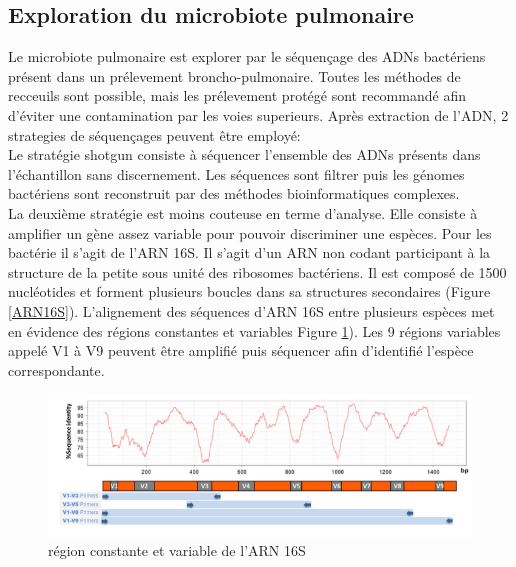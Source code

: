 \documentclass[12pt,a4paper]{article}
\begin{document}
\subsection{Exploration du microbiote pulmonaire}
Le microbiote pulmonaire est explorer par le séquençage des ADNs bactériens présent dans un prélevement broncho-pulmonaire. Toutes les méthodes de recceuils sont possible, mais les prélevement protégé sont recommandé afin d’éviter une contamination par les voies superieurs.
Après extraction de l'ADN, 2 strategies de séquençages peuvent être employé: \\
Le stratégie shotgun consiste à séquencer l'ensemble des ADNs présents dans l'échantillon sans discernement. Les séquences sont filtrer puis les génomes bactériens sont reconstruit par des méthodes bioinformatiques complexes. \\
La deuxième stratégie est moins couteuse en terme d'analyse. Elle consiste à amplifier un gène assez variable pour pouvoir discriminer une espèces. Pour les bactérie il s'agit de l'ARN 16S. Il s'agit d'un ARN non codant participant à la structure de la petite sous unité des ribosomes bactériens. Il est composé de 1500 nucléotides et forment plusieurs boucles dans sa structures secondaires (Figure \ref{ARN16S}). 
L'alignement des séquences d'ARN 16S entre plusieurs espèces met en évidence des régions constantes et variables Figure \ref{ARN16SVariation}). Les 9 régions variables appelé V1 à V9 peuvent être amplifié puis séquencer afin d'identifié l'espèce correspondante.

\begin{figure}[ht]
\begin{center}
\includegraphics[scale=0.8]{img/ARN16S_variation.png}\hfill
\end{center}
\caption{région constante et variable de l'ARN 16S}
\label{ARN16SVariation}
\end{figure}
\end{document}
